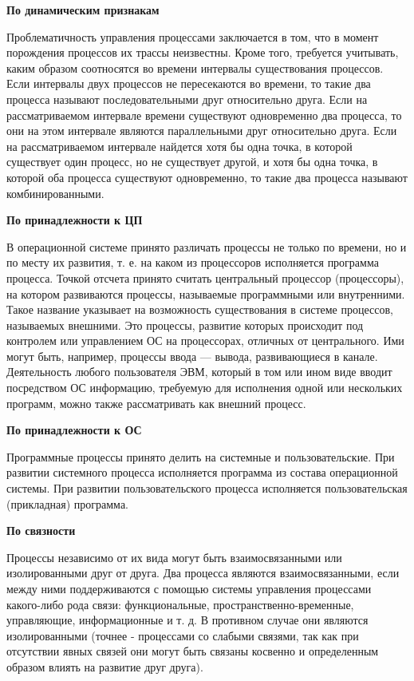 \textbf{По динамическим признакам}

Проблематичность управления процессами заключается в том, что в момент порождения процессов их трассы неизвестны. Кроме того, требуется учитывать, каким образом соотносятся во времени интервалы существования процессов. Если интервалы двух процессов не пересекаются во времени, то такие два процесса называют последовательными друг относительно друга. Если на рассматриваемом интервале времени существуют одновременно два процесса, то они на этом интервале являются параллельными друг относительно друга. Если на рассматриваемом интервале найдется хотя бы одна точка, в которой существует один процесс, но не существует другой, и хотя бы одна точка, в которой оба процесса существуют одновременно, то такие два процесса называют комбинированными.
\newline

\textbf{По принадлежности к ЦП}

В операционной системе принято различать процессы не только по времени, но и по месту их развития, т. е. на каком из процессоров исполняется программа процесса. Точкой отсчета принято считать центральный процессор (процессоры), на котором развиваются процессы, называемые программными или внутренними. Такое название указывает на возможность существования в системе процессов, называемых внешними. Это процессы, развитие которых происходит под контролем или управлением ОС на процессорах, отличных от центрального. Ими могут быть, например, процессы ввода — вывода, развивающиеся в канале. Деятельность любого пользователя ЭВМ, который в том или ином виде вводит посредством ОС информацию, требуемую для исполнения одной или нескольких программ, можно также рассматривать как внешний процесс.
\newline

\textbf{По принадлежности к ОС}

Программные процессы принято делить на системные и пользовательские. При развитии системного процесса исполняется программа из состава операционной системы. При развитии пользовательского процесса исполняется пользовательская (прикладная) программа.
\newline

\textbf{По связности}

Процессы независимо от их вида могут быть взаимосвязанными или изолированными друг от друга. Два процесса являются взаимосвязанными, если между ними поддерживаются с помощью системы управления процессами какого-либо рода связи: функциональные, пространственно-временные, управляющие, информационные и т. д. В противном случае они являются изолированными (точнее - процессами со слабыми связями, так как при отсутствии явных связей они могут быть связаны косвенно и определенным образом влиять на развитие друг друга).

